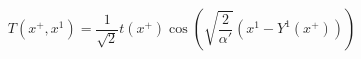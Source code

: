 \begin{equation}
 T ( x^+, x^1) = \frac{1}{\sqrt{2}} t (x^+)
 \cos \left( \sqrt{\frac{2}{\alpha'}} (x^1 - Y^1(x^+))\right) 
\end{equation}

